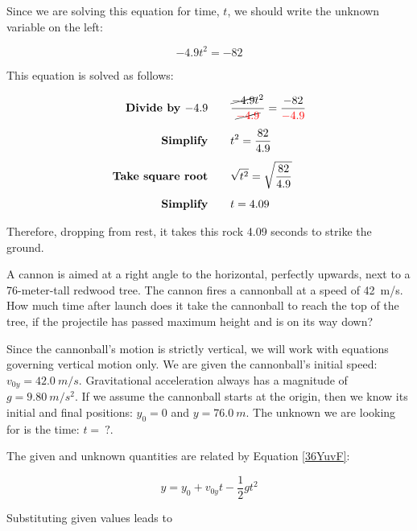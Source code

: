 \documentclass[main-physics.tex]{subfiles}
\begin{document}
Since we are solving this equation for time, $t$, we should write the unknown variable on the left:

\begin{equation*}
    -4.9 t^2 = -82
\end{equation*}

This equation is solved as follows:

\begin{align*}
    \textbf{Divide by $-4.9$} \qquad & \frac{\cancel{-4.9} t^2}{\cancel{\mathbin{\color{red} -} \textcolor{red}{4.9}}} = \frac{-82}{\mathbin{\color{red} -} \textcolor{red}{4.9}}\\[1ex]
    \textbf{Simplify} \qquad & t^2 = \frac{82}{4.9}\\[1ex]
    \textbf{Take square root} \qquad & \sqrt{t^2} = \sqrt{\frac{82}{4.9}}\\[1ex]
    \textbf{Simplify} \qquad & t = 4.09
\end{align*}

Therefore, dropping from rest, it takes this rock 4.09 seconds to strike the ground.

\endsolution


\begin{example} \label{lB7EDG}
    A cannon is aimed at a right angle to the horizontal, perfectly upwards, next to a 76-meter-tall redwood tree. The cannon fires a cannonball at a speed of \SI{42}{m/s}. How much time after launch does it take the cannonball to reach the top of the tree, if the projectile has passed maximum height and is on its way down?
\end{example}

\Solution Since the cannonball's motion is strictly vertical, we will work with equations governing vertical motion only. We are given the cannonball's initial speed: $v_{0y} = \SI{42.0}{m/s}$. Gravitational acceleration always has a magnitude of $g = \SI{9.80}{m/s^2}$. If we assume the cannonball starts at the origin, then we know its initial and final positions: $y_0 = 0$ and $y = \SI{76.0}{m}$. The unknown we are looking for is the time: $t =\ ?$.

\vspace{1em}

The given and unknown quantities are related by Equation \eqref{36YuvF}:

\begin{equation*}
    y = y_0 + v_{0y}t - \frac{1}{2}  g t^2
\end{equation*}

Substituting given values leads to 
\end{document}
